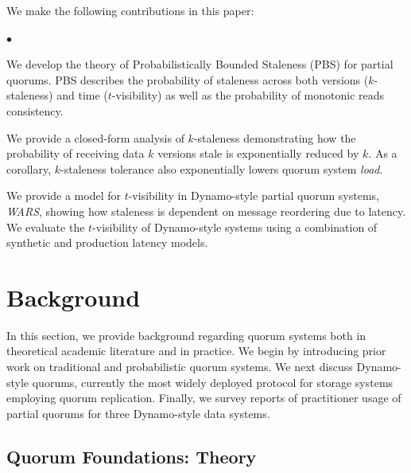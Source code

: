 \documentclass{vldb}
\newcommand{\sectionskip}{-0em}
\newcommand{\subsectionskip}{-0em}
\newenvironment{myitemize}
{
   \vspace{-1mm}
    \begin{list}{$\bullet$ }{}
        \setlength{\topsep}{0em}
        \setlength{\parskip}{0pt}
        \setlength{\partopsep}{0pt}
        \setlength{\parsep}{0pt}         
        \setlength{\itemsep}{.25em} 
}
{
    \end{list} 
    \vspace{-1em}
}
\begin{document}
We make the following contributions in this paper:

\begin{myitemize}

\item We develop the theory of Probabilistically Bounded Staleness
  (PBS) for partial quorums. PBS describes the probability of
  staleness across both versions ($k$-staleness) and time
  ($t$-visibility) as well as the probability of monotonic reads
  consistency.

\item We provide a closed-form analysis of $k$-staleness demonstrating
  how the probability of receiving data $k$ versions stale is
  exponentially reduced by $k$.  As a corollary, $k$-staleness tolerance also
  exponentially lowers quorum system \textit{load}.

\item We provide a model for $t$-visibility in Dynamo-style partial
  quorum systems, \textit{WARS}, showing how staleness is dependent on
  message reordering due to latency.  We evaluate the $t$-visibility
  of Dynamo-style systems using a combination of synthetic and
  production latency models.

\end{myitemize}

\vspace{\sectionskip}\section{Background}
\label{sec:background}

In this section, we provide background regarding quorum systems both
in theoretical academic literature and in practice.  We begin by
introducing prior work on traditional and probabilistic quorum
systems.  We next discuss Dynamo-style quorums, currently the most
widely deployed protocol for storage systems employing quorum
replication.  Finally, we survey reports of practitioner usage of
partial quorums for three Dynamo-style data systems.

\vspace{\subsectionskip}\subsection{Quorum Foundations: Theory}
\end{document}
